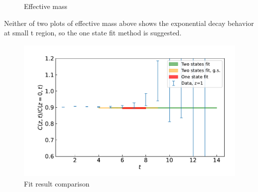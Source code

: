\documentclass{article}
\begin{document}
\begin{figure}[htbp]
    \centering
    \centering
    \caption{Effective mass}
\end{figure}

Neither of two plots of effective mass above shows the exponential decay behavior at small t region, so the one state fit method is suggested.

\begin{figure}
    \centering
    \includegraphics[height=7cm,width=11.3cm]{fit_fig/b_fit_result.pdf}
    \caption{Fit result comparison}
\end{figure}
\end{document}

